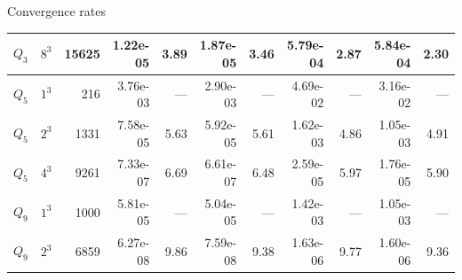 \documentclass{beamer}
\begin{document}
\begin{frame}[shrink=30]{Convergence rates}
\begin{tabular}{lrr rr rr rr rr}
$Q_3$ & $8^3$ & 15625 & 1.22e-05 & 3.89 & 1.87e-05 & 3.46 & 5.79e-04 & 2.87 & 5.84e-04 & 2.30\\
\midrule
$Q_5$ & $1^3$ & 216 & 3.76e-03 & --- & 2.90e-03 & --- & 4.69e-02 & --- & 3.16e-02 & --- \\
$Q_5$ & $2^3$ & 1331 & 7.58e-05 & 5.63 & 5.92e-05 & 5.61 & 1.62e-03 & 4.86 & 1.05e-03 & 4.91 \\
$Q_5$ & $4^3$ & 9261 & 7.33e-07 & 6.69 & 6.61e-07 & 6.48 & 2.59e-05 & 5.97 & 1.76e-05 & 5.90\\
\midrule
$Q_9$ & $1^3$ & 1000 & 5.81e-05 & --- & 5.04e-05 & --- & 1.42e-03 & --- & 1.05e-03 & --- \\
$Q_9$ & $2^3$ & 6859 & 6.27e-08 & 9.86 & 7.59e-08 & 9.38 & 1.63e-06 & 9.77 & 1.60e-06 & 9.36 \\
\bottomrule
  \end{tabular}
\end{frame}
\end{document}
